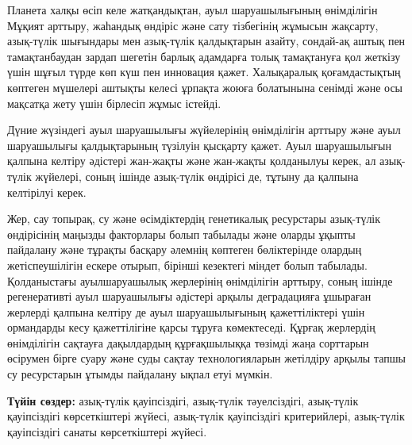 Планета халқы өсіп келе жатқандықтан, ауыл шаруашылығының өнімділігін
Мұқият арттыру, жаһандық өндіріс және сату тізбегінің жұмысын жақсарту,
азық-түлік шығындары мен азық-түлік қалдықтарын азайту, сондай-ақ аштық
пен тамақтанбаудан зардап шегетін барлық адамдарға толық тамақтануға қол
жеткізу үшін шұғыл түрде көп күш пен инновация қажет. Халықаралық
қоғамдастықтың көптеген мүшелері аштықты келесі ұрпақта жоюға болатынына
сенімді және осы мақсатқа жету үшін бірлесіп жұмыс істейді.

Дүние жүзіндегі ауыл шаруашылығы жүйелерінің өнімділігін арттыру және
ауыл шаруашылығы қалдықтарының түзілуін қысқарту қажет. Ауыл
шаруашылығын қалпына келтіру әдістері жан-жақты және жан-жақты
қолданылуы керек, ал азық-түлік жүйелері, соның ішінде азық-түлік
өндірісі де, тұтыну да қалпына келтірілуі керек.

Жер, сау топырақ, су және өсімдіктердің генетикалық ресурстары
азық-түлік өндірісінің маңызды факторлары болып табылады және оларды
ұқыпты пайдалану және тұрақты басқару әлемнің көптеген бөліктерінде
олардың жетіспеушілігін ескере отырып, бірінші кезектегі міндет болып
табылады. Қолданыстағы ауылшаруашылық жерлерінің өнімділігін арттыру,
соның ішінде регенеративті ауыл шаруашылығы әдістері арқылы деградацияға
ұшыраған жерлерді қалпына келтіру де ауыл шаруашылығының қажеттіліктері
үшін ормандарды кесу қажеттілігіне қарсы тұруға көмектеседі. Құрғақ
жерлердің өнімділігін сақтауға дақылдардың құрғақшылыққа төзімді жаңа
сорттарын өсірумен бірге суару және суды сақтау технологияларын
жетілдіру арқылы тапшы су ресурстарын ұтымды пайдалану ықпал етуі
мүмкін.

{\bfseries Түйін сөздер:} азық-түлік қауіпсіздігі, азық-түлік тәуелсіздігі,
азық-түлік қауіпсіздігі көрсеткіштері жүйесі, азық-түлік қауіпсіздігі
критерийлері, азық-түлік қауіпсіздігі санаты көрсеткіштері жүйесі.

